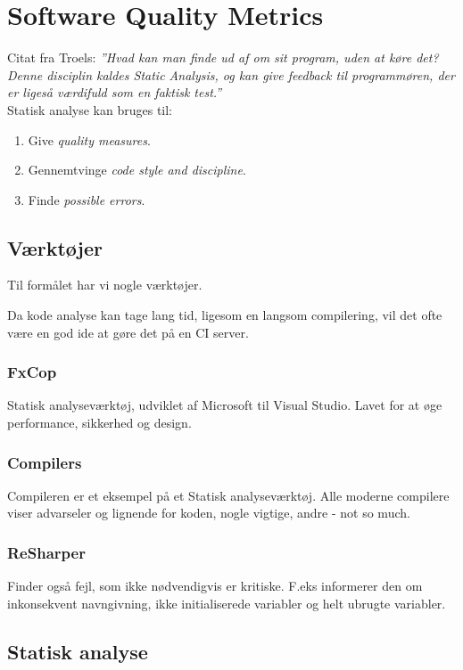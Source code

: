 \section{Software Quality Metrics}
Citat fra Troels: \textit{''Hvad kan man finde ud af om sit program, uden at køre det? Denne disciplin kaldes Static Analysis, og kan give feedback til programmøren, der er ligeså værdifuld som en faktisk test.''}\\

Statisk analyse kan bruges til: 

\begin{enumerate}
	\item Give \textit{quality measures}.
	\item Gennemtvinge \textit{code style and discipline}.
	\item Finde \textit{possible errors}.
\end{enumerate}

\subsection{Værktøjer} 
Til formålet har vi nogle værktøjer. 

Da kode analyse kan tage lang tid, ligesom en langsom compilering, vil det ofte være en god ide at gøre det på en CI server.

\subsubsection{FxCop}
Statisk analyseværktøj, udviklet af Microsoft til Visual Studio. Lavet for at øge performance, sikkerhed og design.

\subsubsection{Compilers}
Compileren er et eksempel på et Statisk analyseværktøj. Alle moderne compilere viser advarseler og lignende for koden, nogle vigtige, andre - not so much.

\subsubsection{ReSharper}
Finder også fejl, som ikke nødvendigvis er kritiske. F.eks informerer den om inkonsekvent navngivning, ikke initialiserede variabler og helt ubrugte variabler.

\subsection{Statisk analyse}

